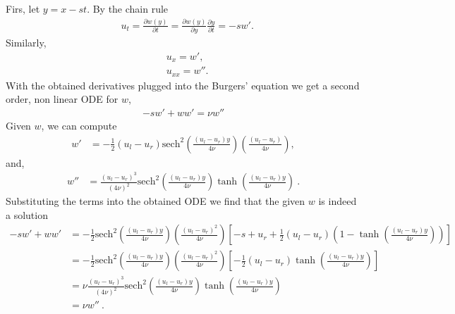 
\begin{questions}


\begin{solution}

Firs, let $y = x-st$. By the chain rule
\begin{align*}
& u_t = \frac{\partial w(y)}{\partial t} =\frac{\partial w(y)}{\partial y}\frac{\partial y}{\partial t} = -sw'.
\end{align*}
Similarly,
\begin{align*}
& u_x = w',\\
& u_{xx} = w''.
\end{align*}
With the obtained derivatives plugged into the Burgers' equation we get a second order, non linear ODE for $w$,
\begin{align*}
-sw'+ww' = \nu w''
\end{align*}
Given $w$, we can compute
\begin{align*}
w' & = -\frac{1}{2}(u_l-u_r)\text{sech}^2\left(\frac{(u_l-u_r)y}{4\nu}\right)\left(\frac{(u_l-u_r)}{4\nu} \right),
\end{align*}
and,
\begin{align*}
w'' & = \frac{(u_l-u_r)^3}{(4\nu)^2}\text{sech}^2\left(\frac{(u_l-u_r)y}{4\nu}\right)\tanh\left(\frac{(u_l-u_r)y}{4\nu}\right) ~.
\end{align*}
Substituting the terms into the obtained ODE we find that the given $w$ is indeed a solution
\begin{align*}
-sw'+ww' &= -\frac{1}{2}\text{sech}^2\left(\frac{(u_l-u_r)y}{4\nu}\right)\left(\frac{(u_l-u_r)^2}{4\nu} \right)\left[-s+u_r+\frac{1}{2}(u_l-u_r)\left(1-\tanh\left(\frac{(u_l-u_r)y}{4\nu}\right)\right)\right] \\
& = -\frac{1}{2}\text{sech}^2\left(\frac{(u_l-u_r)y}{4\nu}\right)\left(\frac{(u_l-u_r)^2}{4\nu} \right)\left[-\frac{1}{2}(u_l-u_r)\tanh\left(\frac{(u_l-u_r)y}{4\nu}\right)\right] \\
& = \nu\frac{(u_l-u_r)^3}{(4\nu)^2}\text{sech}^2\left(\frac{(u_l-u_r)y}{4\nu}\right)\tanh\left(\frac{(u_l-u_r)y}{4\nu}\right) \\
& = \nu w''~.
\end{align*}

\end{solution}

\end{questions}
